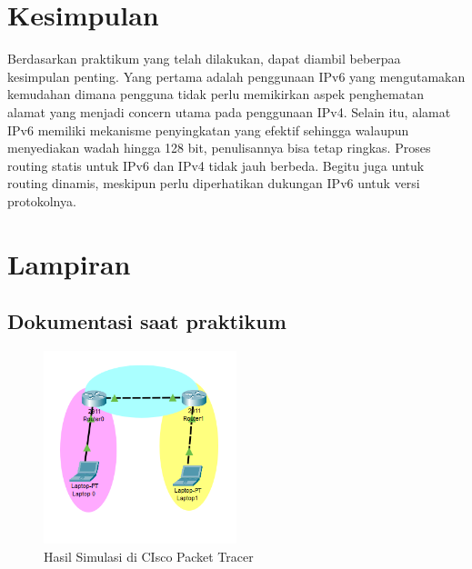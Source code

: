\section{Kesimpulan}
Berdasarkan praktikum yang telah dilakukan, dapat diambil beberpaa kesimpulan penting. Yang pertama adalah penggunaan IPv6 yang mengutamakan kemudahan dimana pengguna tidak perlu memikirkan aspek penghematan alamat yang menjadi concern utama pada penggunaan IPv4. Selain itu, alamat IPv6 memiliki mekanisme penyingkatan yang efektif sehingga walaupun menyediakan wadah hingga 128 bit, penulisannya bisa tetap ringkas. Proses routing statis untuk IPv6 dan IPv4 tidak jauh berbeda. Begitu juga untuk routing dinamis, meskipun perlu diperhatikan dukungan IPv6 untuk versi protokolnya.

\section{Lampiran}
\subsection{Dokumentasi saat praktikum}

\begin{figure}[H] 
    \centering
    \includegraphics[width=0.5\textwidth]{tumod/simulasi.png} 
    \caption{Hasil Simulasi di CIsco Packet Tracer} 
    \label{fig:tumod10} 
\end{figure}